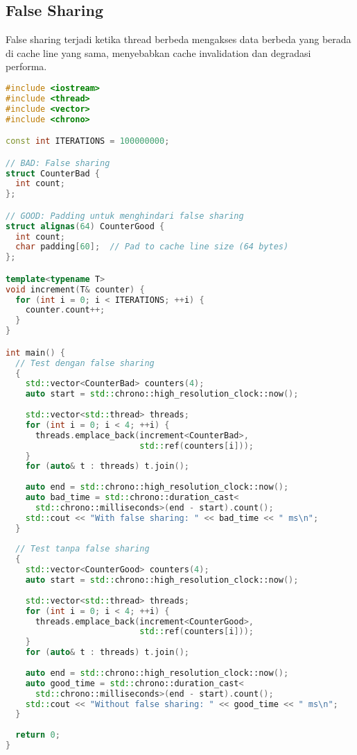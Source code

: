 \documentclass[../main.tex]{subfiles}
\begin{document}
\subsection{False Sharing}
False sharing terjadi ketika thread berbeda mengakses data berbeda yang berada di cache line yang sama, menyebabkan cache invalidation dan degradasi performa.

\begin{lstlisting}[language=C++, caption={False sharing dan solusinya}]
#include <iostream>
#include <thread>
#include <vector>
#include <chrono>

const int ITERATIONS = 100000000;

// BAD: False sharing
struct CounterBad {
  int count;
};

// GOOD: Padding untuk menghindari false sharing
struct alignas(64) CounterGood {
  int count;
  char padding[60];  // Pad to cache line size (64 bytes)
};

template<typename T>
void increment(T& counter) {
  for (int i = 0; i < ITERATIONS; ++i) {
    counter.count++;
  }
}

int main() {
  // Test dengan false sharing
  {
    std::vector<CounterBad> counters(4);
    auto start = std::chrono::high_resolution_clock::now();
    
    std::vector<std::thread> threads;
    for (int i = 0; i < 4; ++i) {
      threads.emplace_back(increment<CounterBad>, 
                           std::ref(counters[i]));
    }
    for (auto& t : threads) t.join();
    
    auto end = std::chrono::high_resolution_clock::now();
    auto bad_time = std::chrono::duration_cast<
      std::chrono::milliseconds>(end - start).count();
    std::cout << "With false sharing: " << bad_time << " ms\n";
  }
  
  // Test tanpa false sharing
  {
    std::vector<CounterGood> counters(4);
    auto start = std::chrono::high_resolution_clock::now();
    
    std::vector<std::thread> threads;
    for (int i = 0; i < 4; ++i) {
      threads.emplace_back(increment<CounterGood>, 
                           std::ref(counters[i]));
    }
    for (auto& t : threads) t.join();
    
    auto end = std::chrono::high_resolution_clock::now();
    auto good_time = std::chrono::duration_cast<
      std::chrono::milliseconds>(end - start).count();
    std::cout << "Without false sharing: " << good_time << " ms\n";
  }
  
  return 0;
}
\end{lstlisting}
\end{document}
